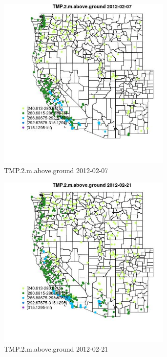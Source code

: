 \begin{figure} 
\centering  
\includegraphics[width=0.77\textwidth]{Code_Outputs/Report_ML_input_PM25_Step4_part_f_de_duplicated_aves_prioritize_24hr_obswNAs_MapObsTMP2maboveground2012-02-07.jpg} 
\caption{\label{fig:Report_ML_input_PM25_Step4_part_f_de_duplicated_aves_prioritize_24hr_obswNAsMapObsTMP2maboveground2012-02-07}TMP.2.m.above.ground 2012-02-07} 
\end{figure} 
 

\begin{figure} 
\centering  
\includegraphics[width=0.77\textwidth]{Code_Outputs/Report_ML_input_PM25_Step4_part_f_de_duplicated_aves_prioritize_24hr_obswNAs_MapObsTMP2maboveground2012-02-21.jpg} 
\caption{\label{fig:Report_ML_input_PM25_Step4_part_f_de_duplicated_aves_prioritize_24hr_obswNAsMapObsTMP2maboveground2012-02-21}TMP.2.m.above.ground 2012-02-21} 
\end{figure} 
 

